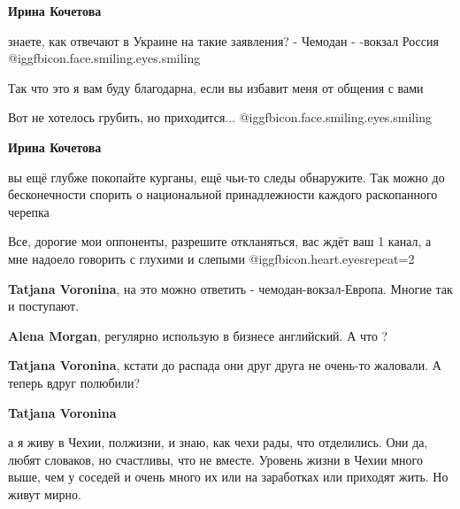 \begin{itemize}
\begin{itemize}
\textbf{Ирина Кочетова} 

знаете, как отвечают в Украине на такие заявления? - Чемодан - -вокзал Россия
@igg{fbicon.face.smiling.eyes.smiling} 

Так что это я вам буду благодарна, если вы избавит меня от общения с вами

Вот не хотелось грубить, но приходится...
@igg{fbicon.face.smiling.eyes.smiling} 

\textbf{Ирина Кочетова} 

вы ещё глубже покопайте курганы, ещё чьи-то следы обнаружите. Так можно до
бесконечности спорить о национальной принадлежности каждого раскопанного
черепка


Все, дорогие мои оппоненты, разрешите откланяться, вас ждёт ваш 1 канал, а мне
надоело говорить с глухими и слепыми @igg{fbicon.heart.eyes}{repeat=2} 

\textbf{Tatjana Voronina}, на это можно ответить - чемодан-вокзал-Европа. Многие так и поступают.

\textbf{Alena Morgan}, регулярно использую в бизнесе английский. А что ?

\textbf{Tatjana Voronina}, кстати до распада они друг друга не очень-то жаловали. А теперь вдруг полюбили?

\textbf{Tatjana Voronina} 

а я живу в Чехии, полжизни, и знаю, как чехи рады, что отделились. Они да,
любят словаков, но счастливы, что не вместе. Уровень жизни в Чехии много выше,
чем у соседей и очень много их или на заработках или приходят жить. Но живут
мирно.


\end{itemize} %

\end{itemize} %

